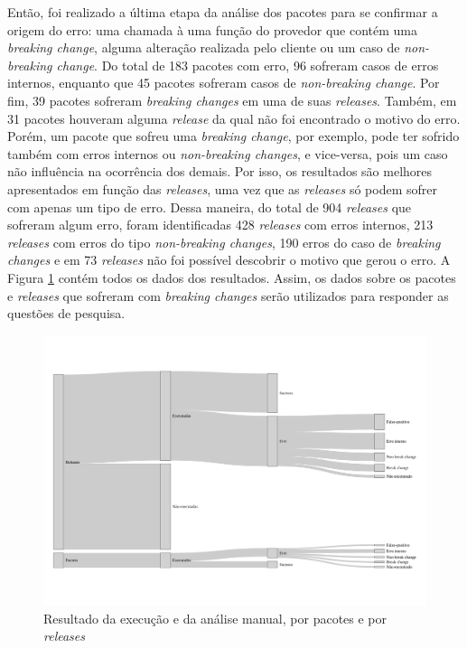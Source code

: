 Então, foi realizado a última etapa da análise dos pacotes para se confirmar a origem do erro: uma chamada à uma função do provedor que contém uma \textit{breaking change}, alguma alteração realizada pelo cliente ou um caso de \textit{non-breaking change}. Do total de 183 pacotes com erro, 96 sofreram casos de erros internos, enquanto que 45 pacotes sofreram casos de \textit{non-breaking change}. Por fim, 39 pacotes sofreram \textit{breaking changes} em uma de suas \textit{releases}. Também, em 31 pacotes houveram alguma \textit{release} da qual não foi encontrado o motivo do erro. Porém, um pacote que sofreu uma \textit{breaking change}, por exemplo, pode ter sofrido também com erros internos ou \textit{non-breaking changes}, e vice-versa, pois um caso não influência na ocorrência dos demais. Por isso, os resultados são melhores apresentados em função das \textit{releases}, uma vez que as \textit{releases} só podem sofrer com apenas um tipo de erro. Dessa maneira, do total de 904 \textit{releases} que sofreram algum erro, foram identificadas 428 \textit{releases} com erros internos, 213 \textit{releases} com erros do tipo \textit{non-breaking changes}, 190 erros do caso de \textit{breaking changes} e em 73 \textit{releases} não foi possível descobrir o motivo que gerou o erro. A Figura \ref{fig:res_rq1_g} contém todos os dados dos resultados. Assim, os dados sobre os pacotes e \textit{releases} que sofreram com \textit{breaking changes} serão utilizados para responder as questões de pesquisa.

\begin{figure}
    \centering
    \includegraphics[scale=0.5]{figuras/general_results.pdf}
    \caption{Resultado da execução e da análise manual, por pacotes e por \textit{releases}}
    \label{fig:res_rq1_g}
\end{figure}{}